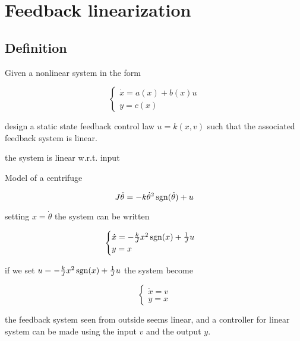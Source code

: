 \chapter{Feedback linearization}

\section{Definition}

Given a nonlinear system in the form

\[
    \begin{cases}
        \dot x = a(x) + b(x) u \\
        y = c(x)
    \end{cases}
\]

design a static state feedback control law $u = k(x,v)$ such that the associated feedback system is linear.

\begin{nb} the system is linear w.r.t. input \end{nb}

\begin{example}
    Model of a centrifuge

    \[
        J \ddot\theta = -k \dot \theta^2 \operatorname{sgn}(\dot \theta) + u
    \]

    setting $x = \dot\theta$ the system can be written

    \[
    \begin{cases}
        \dot x = - \frac{k}{J} x^2 \operatorname{sgn}(x) + \frac{1}{J} u \\
        y = x
    \end{cases}
    \]

    if we set $u = - \frac{k}{J}x^2 \operatorname{sgn}(x) + \frac{1}{J}u$ the system become

    \[
    \begin{cases}
        \dot x = v \\
        y = x
    \end{cases}
    \]

    the feedback system seen from outside seems linear, and a controller for linear system can be made using the input $v$ and the output $y$.
\end{example}